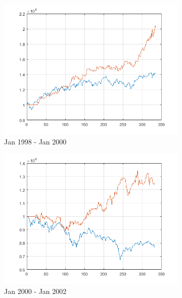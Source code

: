 \documentclass[11pt,a4,twosided,singlespacing,titlepagenumber=on]{scrreprt}
\numberwithin{equation}{chapter} %
\theoremstyle{remark}
\begin{document}
\begin{figure}[H]
\begin{subfigure}[t]{0.32\textwidth}
        \includegraphics[width=1\textwidth]{res/backtest/5}
        \caption{Jan 1998 - Jan 2000}
    \end{subfigure}
    \begin{subfigure}[t]{0.32\textwidth}
        \centering
        \includegraphics[width=1\textwidth]{res/backtest/6}
        \caption{Jan 2000 - Jan 2002}
    \end{subfigure}
    \begin{subfigure}[t]{0.32\textwidth}
        \centering

\end{subfigure}
\end{figure}
\end{document}
